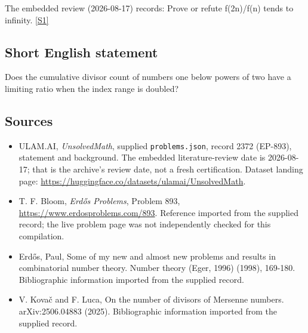 \documentclass[11pt,a4paper]{article}
\newcommand{\sref}[2]{\hyperlink{source:#1:#2}{[S#2]}}
\begin{document}
The embedded review (2026-08-17) records: Prove or refute f(2n)/f(n) tends to infinity. \sref{2372}{1}

\subsection{Short English statement}

Does the cumulative divisor count of numbers one below powers of two have a limiting ratio when the index range is doubled?

\subsection{Sources}

{\small

\begin{itemize}

\item[\hypertarget{source:2372:1}{S1}] ULAM.AI, \emph{UnsolvedMath}, supplied \texttt{problems.json}, record 2372 (EP-893), statement and background. The embedded literature-review date is 2026-08-17; that is the archive’s review date, not a fresh certification. Dataset landing page: \url{https://huggingface.co/datasets/ulamai/UnsolvedMath}.

\item[\hypertarget{source:2372:2}{S2}] T. F. Bloom, \emph{Erdős Problems}, Problem 893, \url{https://www.erdosproblems.com/893}. Reference imported from the supplied record; the live problem page was not independently checked for this compilation.

\item[\hypertarget{source:2372:3}{S3}] Erd\H{o}s, Paul, Some of my new and almost new problems and results in combinatorial number theory. Number theory (Eger, 1996) (1998), 169-180. Bibliographic information imported from the supplied record.

\item[\hypertarget{source:2372:4}{S4}] V. Kova\v{c} and F. Luca, On the number of divisors of Mersenne numbers. arXiv:2506.04883 (2025). Bibliographic information imported from the supplied record.

\end{itemize}

}

\label{end:2372}
\end{document}

